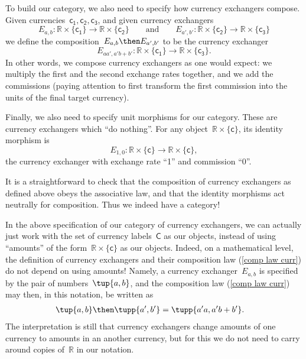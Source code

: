 To build our category, we also need to specify how currency exchangers compose. Given currencies~$\mathsf{c_1}, \mathsf{c_2}, \mathsf{c_3}$, and given currency exchangers
\begin{equation*}
E_{a,b} \colon \mathbb{R} \times \{\mathsf{c_1} \} \rightarrow \mathbb{R} \times \{ \mathsf{c_2}\}
\qquad \text{and} \qquad
E_{a',b'} \colon \mathbb{R} \times \{\mathsf{c_2}\} \rightarrow \mathbb{R} \times \{\mathsf{c_3}\}
\end{equation*}
we define the composition~$E_{a,b} \then E_{a',b'}$ to be the currency exchanger
\begin{equation}
\label{comp law curr}
E_{aa',a'b + b'} \colon \mathbb{R} \times \{\mathsf{c_1}\} \rightarrow \mathbb{R} \times \{\mathsf{c_3}\}.
\end{equation}
In other words, we compose currency exchangers as one would expect: we multiply the first and the second exchange rates together, and we add the commissions (paying attention to first transform the first commission into the units of the final target currency).

Finally, we also need to specify unit morphisms for our category. These are currency exchangers which ``do nothing''. For any object~$\mathbb{R} \times \{ \mathsf{c}\}$, its identity morphism is 
\begin{equation*}
E_{1,0} \colon \mathbb{R} \times \{\mathsf{c}\} \rightarrow \mathbb{R} \times \{\mathsf{c}\},
\end{equation*}
the currency exchanger with exchange rate ``1''  and commission ``0''. 

It is a straightforward to check that the composition of currency exchangers as defined above obeys the associative law, and that the identity morphisms act neutrally for composition. Thus we indeed have a category!

\begin{remark}
In the above specification of our category of currency exchangers, we can actually just work with the set of currency labels~$\mathsf{C}$ as our objects, instead of using ``amounts'' of the form~$\mathbb{R} \times \{\mathsf{c}\}$ as our objects. Indeed, on a mathematical level, the definition of currency exchangers and their composition law (\cref{comp law curr}) do not depend on using amounts! Namely, a currency exchanger~$E_{a,b}$ is specified by the pair of numbers~$\tup{a, b}$, and the composition law (\ref{comp law curr}) may then, in this notation, be written as 
\begin{equation}
\begin{aligned}
\label{eq:currencycomp}
    \tup{a,b}\then \tupp{a',b'}&=\tupp{a' a, a' b + b'}.
\end{aligned}
\end{equation}
The interpretation is still that currency exchangers change amounts of one currency to amounts in an another currency, but for this we do not need to carry around copies of~$\mathbb{R}$ in our notation.
\end{remark}


